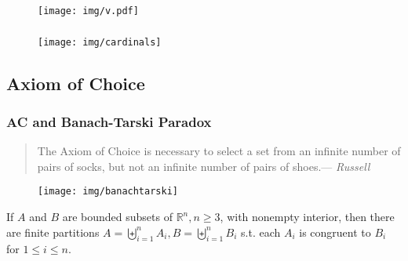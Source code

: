 \documentclass[UTF8,aspectratio=43,11pt,colorlinks,compress,openany]{beamer}%
\begin{document}
\begin{frame}\frametitle{}
			\begin{figure}
			\texttt{[image: img/v.pdf]}
			\end{figure}
\end{frame}

\begin{frame}\frametitle{}
	\begin{figure}
		\texttt{[image: img/cardinals]}
	\end{figure}
\end{frame}

\subsection{Axiom of Choice}

\begin{frame}\frametitle{AC and Banach-Tarski Paradox}
	\begin{quote}
		The Axiom of Choice is necessary to select a set from an infinite number of pairs of socks, but not an infinite number of pairs of shoes.\hfill --- \textsl{Russell}
	\end{quote}
	\begin{figure}
		\texttt{[image: img/banachtarski]}
	\end{figure}
	\begin{theorem}
		If $A$ and $B$ are bounded subsets of $\mathbb{R}^n, n\geq 3$, with nonempty interior, then there are finite partitions $A=\biguplus\limits_{i=1}^n A_i, B=\biguplus\limits_{i=1}^n B_i$ s.t. each $A_i$ is congruent to $B_i$ for $1\leq i\leq n$.
	\end{theorem}
\end{frame}
\end{document}

